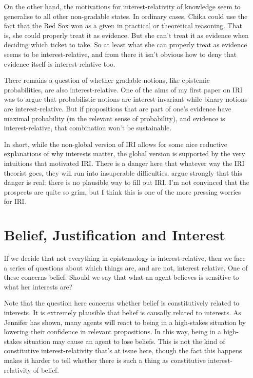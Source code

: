 On the other hand, the motivations for interest-relativity of knowledge seem to generalise to all other non-gradable states. In ordinary cases, Chika could use the fact that the Red Sox won as a given in practical or theoretical reasoning. That is, she could properly treat it as evidence. But she can't treat it as evidence when deciding which ticket to take. So at least what she can properly treat as evidence seems to be interest-relative, and from there it isn't obvious how to deny that evidence itself is interest-relative too.

There remains a question of whether gradable notions, like epistemic probabilities, are also interest-relative. One of the aims of my first paper on IRI ~\citep{Weatherson2005} was to argue that probabilistic notions are interest-invariant while binary notions are interest-relative. But if propositions that are part of one's evidence have maximal probability (in the relevant sense of probability), and evidence is interest-relative, that combination won't be sustainable. 

In short, while the non-global version of IRI allows for some nice reductive explanations of why interests matter, the global version is supported by the very intuitions that motivated IRI. There is a danger here that whatever way the IRI theorist goes, they will run into insuperable difficulties.  \citet{IchikawaEtAl2012} argue strongly that this danger is real; there is no plausible way to fill out IRI. I'm not convinced that the prospects are quite so grim, but I think this is one of the more pressing worries for IRI.

\section{Belief, Justification and Interest}
\label{beliefjustificationandinterest}

If we decide that not everything in epistemology is interest-relative, then we face a series of questions about which things are, and are not, interest relative. One of these concerns belief. Should we say that what an agent believes is sensitive to what her interests are?

Note that the question here concerns whether belief is constitutively related to interests. It is extremely plausible that belief is causally related to interests. As Jennifer  \citet{Nagel2008} has shown, many agents will react to being in a high-stakes situation by lowering their confidence in relevant propositions. In this way, being in a high-stakes situation may cause an agent to lose beliefs. This is not the kind of constitutive interest-relativity that's at issue here, though the fact this happens makes it harder to tell whether there is such a thing as constitutive interest-relativity of belief.

